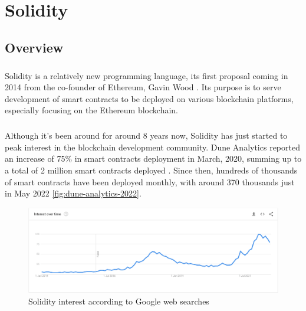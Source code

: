 \chapter{Solidity}

\section{Overview}
\paragraph*{}
Solidity is a relatively new programming language, its first proposal coming in 2014 from the co-founder of Ethereum, Gavin Wood \cite{solidity-lang}. Its purpose is to serve development of smart contracts to be deployed on various blockchain platforms, especially focusing on the Ethereum blockchain.

\paragraph*{}
Although it's been around for around 8 years now, Solidity has just started to peak interest in the blockchain development community. Dune Analytics reported an increase of 75\% in smart contracts deployment in March, 2020, summing up to a total of 2 million smart contracts deployed \cite{coin-telegraph-2020}. Since then, hundreds of thousands of smart contracts have been deployed monthly, with around 370 thousands just in May 2022 \ref{fig:dune-analytics-2022}.

\begin{figure}
    \centering
    \includegraphics[width=15cm]{images/solidity_interest.png}
    \caption{Solidity interest according to Google web searches}
    \label{fig:solidity-interest}
\end{figure}

